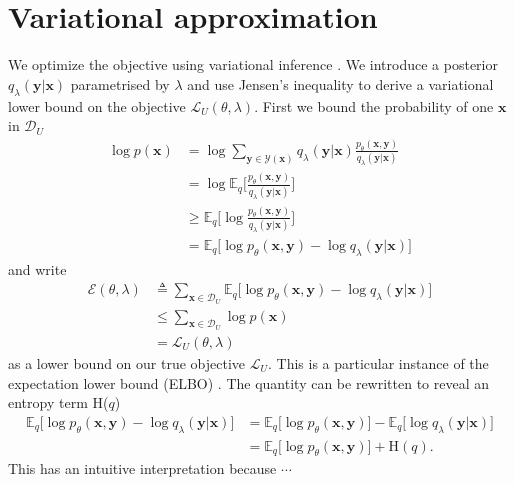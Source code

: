 \section{Variational approximation} We optimize the objective using variational inference \citep{Blei+2016:VI}. We introduce a posterior $q_{\lambda}(\mathbf{y} | \mathbf{x})$ parametrised by $\lambda$ and use Jensen's inequality to derive a variational lower bound on the objective $\mathcal{L}_U(\theta, \lambda)$. First we bound the probability of one $\mathbf{x}$ in $\mathcal{D}_U$
\begin{align}
  \log p (\mathbf{x})
    &= \log \sum_{\mathbf{y}  \in \mathcal{Y}(\mathbf{x})} q_{\lambda}(\mathbf{y} |\mathbf{x}) \frac{p_{\theta}(\mathbf{x},\mathbf{y} )}{q_{\lambda}(\mathbf{y} | \mathbf{x})} \\
    &= \log \mathbb{E}_{q} \bigg[\frac{p_{\theta}(\mathbf{x},\mathbf{y} )}{ q_{\lambda}(\mathbf{y} | \mathbf{x})} \bigg] \\
    &\geq \mathbb{E}_{q} \bigg[\log \frac{p_{\theta}(\mathbf{x},\mathbf{y} )}{q_{\lambda}(\mathbf{y} | \mathbf{x})} \bigg] \\
    &= \mathbb{E}_{q} \big[\log p_{\theta}(\mathbf{x},\mathbf{y} )  - \log q_{\lambda}(\mathbf{y} | \mathbf{x}) \big]
  \label{eq:lowerbound}
\end{align}
and write
\begin{align*}
  \mathcal{E}(\theta, \lambda)
   &\triangleq \sum_{\mathbf{x} \in \mathcal{D}_U} \mathbb{E}_{q} \big[\log p_{\theta}(\mathbf{x},\mathbf{y} )  - \log q_{\lambda}(\mathbf{y} | \mathbf{x}) \big] \\
   &\leq \sum_{\mathbf{x} \in \mathcal{D}_U} \log p (\mathbf{x}) \\
   &= \mathcal{L}_{U}(\theta, \lambda)
\end{align*}
as a lower bound on our true objective $\mathcal{L}_{U}$. This is a particular instance of the expectation lower bound (ELBO) \citep{Blei+2016:VI}. The quantity can be rewritten to reveal an entropy term H($q$)
\begin{align}
  \mathbb{E}_{q} \big[\log p_{\theta}(\mathbf{x},\mathbf{y} )  - \log  q_{\lambda}(\mathbf{y} | \mathbf{x}) \big]
    &=\mathbb{E}_{q} \big[\log p_{\theta}(\mathbf{x},\mathbf{y} ) \big]  - \mathbb{E}_{q} \big[\log q_{\lambda}(\mathbf{y} | \mathbf{x}) \big] \\
    &= \mathbb{E}_{q} \big[\log p_{\theta}(\mathbf{x},\mathbf{y} ) \big]  + \text{H}(q).
  \label{eq:expectation}
\end{align}
This has an intuitive interpretation because $\cdots$

